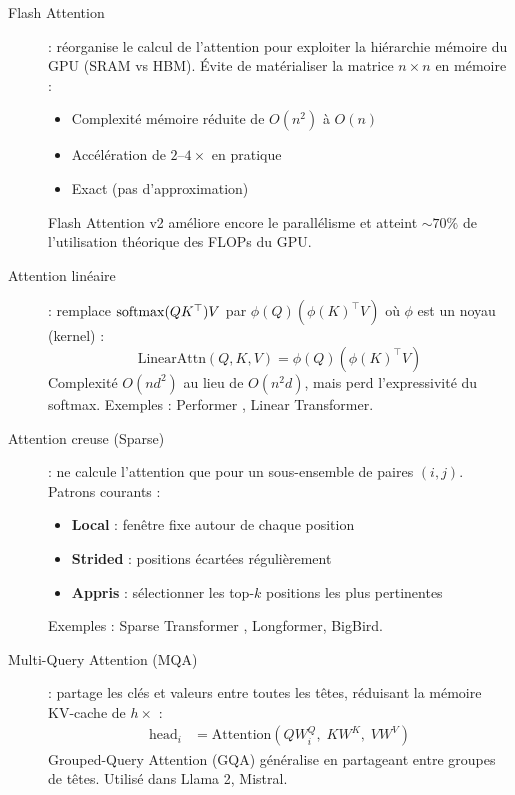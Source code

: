 \begin{sota}[title=\textbf{Variantes modernes de l'attention}]
\begin{description}
  \item[Flash Attention] \cite{dao2022flashattention} : r\'eorganise le calcul
    de l'attention pour exploiter la hi\'erarchie m\'emoire du GPU (SRAM vs HBM).
    \'Evite de mat\'erialiser la matrice $n \times n$ en m\'emoire :
    \begin{itemize}
      \item Complexit\'e m\'emoire r\'eduite de $O(n^2)$ \`a $O(n)$
      \item Acc\'el\'eration de $2\text{--}4\times$ en pratique
      \item Exact (pas d'approximation)
    \end{itemize}
    Flash Attention v2 am\'eliore encore le parall\'elisme et atteint
    $\sim 70\%$ de l'utilisation th\'eorique des FLOPs du GPU.

  \item[Attention lin\'eaire] : remplace $\mathrm{softmax}(QK^\top)V$ par
    $\phi(Q)(\phi(K)^\top V)$ o\`u $\phi$ est un noyau (kernel) :
    \begin{equation}
      \text{LinearAttn}(Q, K, V) = \phi(Q) \left(\phi(K)^\top V\right)
    \end{equation}
    Complexit\'e $O(n d^2)$ au lieu de $O(n^2 d)$, mais perd l'expressivit\'e
    du softmax. Exemples : Performer \cite{choromanski2021rethinking},
    Linear Transformer.

  \item[Attention creuse (Sparse)] : ne calcule l'attention que pour un
    sous-ensemble de paires $(i, j)$. Patrons courants :
    \begin{itemize}
      \item \textbf{Local} : fen\^etre fixe autour de chaque position
      \item \textbf{Strided} : positions \'ecart\'ees r\'eguli\`erement
      \item \textbf{Appris} : s\'electionner les top-$k$ positions les plus
        pertinentes
    \end{itemize}
    Exemples : Sparse Transformer \cite{child2019generating}, Longformer,
    BigBird.

  \item[Multi-Query Attention (MQA)] \cite{shazeer2019fast} : partage les
    cl\'es et valeurs entre toutes les t\^etes, r\'eduisant la m\'emoire
    KV-cache de $h \times$ :
    \begin{align}
      \text{head}_i &= \text{Attention}(Q W_i^Q,\; K W^K,\; V W^V)
    \end{align}
    Grouped-Query Attention (GQA) g\'en\'eralise en partageant entre groupes
    de t\^etes. Utilis\'e dans Llama 2, Mistral.


\end{description}
\end{sota}
